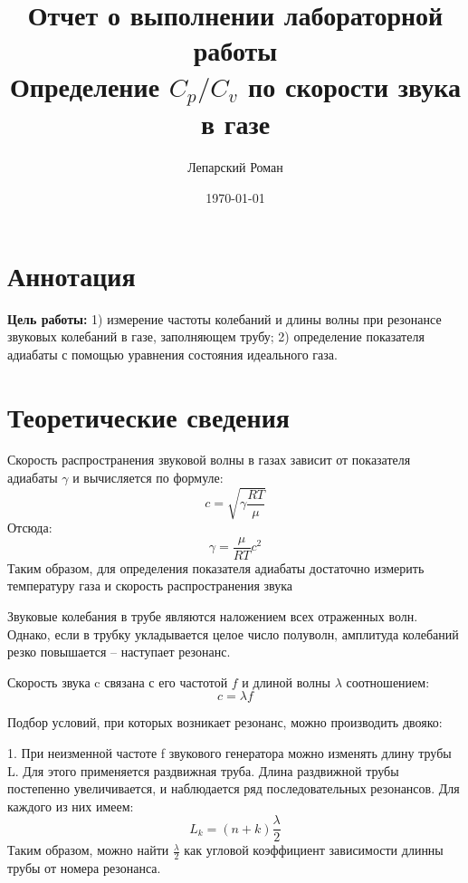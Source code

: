 \documentclass[12pt]{article}
\title{Отчет о выполнении лабораторной работы \\ Определение $C_p/C_v$ по скорости звука в газе}
\author{Лепарский Роман}
\date{\today}
\begin{document}
\maketitle

\newpage

\section{Аннотация}

\textbf{Цель работы:} 1) измерение частоты колебаний и длины волны при резонансе звуковых колебаний в газе, заполняющем трубу; 2) определение показателя адиабаты с помощью уравнения состояния идеального газа.

\section{Теоретические сведения}

Скорость распространения звуковой волны в газах зависит от показателя адиабаты $\gamma$ и вычисляется по формуле:
\begin{equation} \label{eq:sound-speed}
	c=\sqrt{\gamma \frac{RT}{\mu}}
\end{equation}
Отсюда:
\begin{equation} \label{eq:gamma}
	\gamma = \frac{\mu}{RT}c^2
\end{equation}
Таким образом, для определения показателя адиабаты достаточно
измерить температуру газа и скорость распространения звука

Звуковые колебания в трубе являются наложением всех отраженных волн. Однако, если в трубку укладывается целое число полуволн,
амплитуда колебаний резко повышается -- наступает резонанс.

Скорость звука c связана с его частотой $f$ и длиной волны $\lambda$ соотношением:
\begin{equation} \label{eq:c-lambda-f}
	c = \lambda f
\end{equation}

Подбор условий, при которых возникает резонанс, можно производить двояко:

\hspace{7mm} 1. При неизменной частоте f звукового генератора можно изменять длину трубы L. Для этого применяется раздвижная труба. Длина раздвижной трубы постепенно увеличивается, и наблюдается ряд последовательных резонансов. Для каждого из них имеем:
\begin{equation}
	L_{k} = (n+k)\frac{\lambda}{2}
\end{equation}
Таким образом, можно найти $\frac{\lambda}{2}$ как угловой коэффициент зависимости длинны трубы от номера резонанса.
\end{document}
